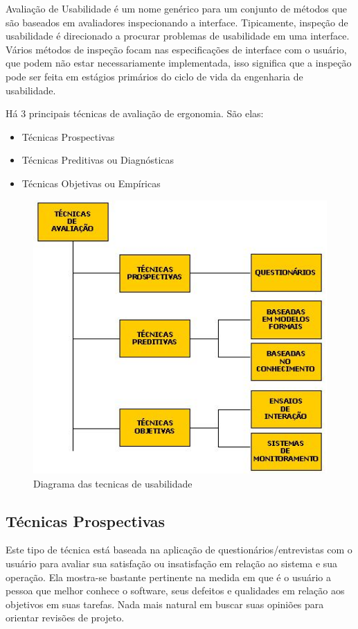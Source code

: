 Avaliação de Usabilidade é um nome genérico para um conjunto de métodos que são baseados em avaliadores inspecionando a interface. Tipicamente, inspeção de usabilidade é direcionado a procurar problemas de usabilidade em uma interface. Vários métodos de inspeção focam nas especificações de interface com o usuário, que podem não estar necessariamente implementada, isso significa que a inspeção pode ser feita em estágios primários do ciclo de vida da engenharia de usabilidade. \cite{nielsen_95}

Há 3 principais técnicas de avaliação de ergonomia. São elas:

\begin{itemize}
  \item Técnicas Prospectivas
  \item Técnicas Preditivas ou Diagnósticas
  \item Técnicas Objetivas ou Empíricas
\end{itemize}

\begin{figure}[here]
\includegraphics[width=120mm]{images/tecnicas_usabilidade.jpg}
\caption{Diagrama das tecnicas de usabilidade}
\label{fig:tecnicas_usabilidade}
\end{figure}

\subsection{Técnicas Prospectivas}

Este tipo de técnica está baseada na aplicação de questionários/entrevistas com o usuário para avaliar sua satisfação ou insatisfação em relação ao sistema e sua operação. Ela mostra-se bastante pertinente na medida em que é o usuário a pessoa que melhor conhece o software, seus defeitos e qualidades em relação aos objetivos em suas tarefas. Nada mais natural em buscar suas opiniões para orientar revisões de projeto.

